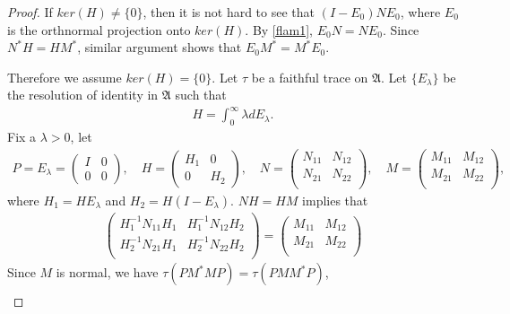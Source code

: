 \documentclass[a4paper,10pt]{amsart}
\newcommand{\AAA}{\mathfrak A}
\begin{document}
\begin{proof}
    If $ker(H) \neq \{0\}$, then it is not hard to see that 
    $(I-E_{0})NE_{0}$, where $E_0$ is the orthnormal projection 
    onto $ker(H)$. 
    By \cref{flam1}, $E_{0}N = NE_{0}$. 
    Since $N^{*}H = HM^{*}$, similar argument shows
    that $E_{0}M^{*} = M^{*}E_{0}$.
    
    Therefore we assume $ker(H) = \{0\}$.
    Let $\tau$ be a faithful trace on $\AAA$.
    Let $\{ E_{\lambda} \}$ be the resolution of identity in $\AAA$ such that
    \begin{align*}
        H = \int_{0}^{\infty} \lambda d E_{\lambda}. 
    \end{align*}
Fix a $\lambda > 0$, let
\begin{align*}
    P = E_{\lambda} = \begin{pmatrix}
          I & 0\\
          0 & 0
      \end{pmatrix}, \quad 
   H = \begin{pmatrix}
       H_1 & 0\\
       0 & H_2
   \end{pmatrix}, \quad  
   N = \begin{pmatrix}
       N_{11} & N_{12}\\ 
       N_{21} & N_{22} \\
   \end{pmatrix}, \quad  
   M = \begin{pmatrix}
       M_{11} & M_{12}\\ 
       M_{21} & M_{22} \\
   \end{pmatrix},
\end{align*}
where $H_1 = HE_{\lambda}$ and $H_2 = H(I-E_{\lambda})$.
$NH = HM$ implies that
\begin{align*}
   \begin{pmatrix}
       H_{1}^{-1}N_{11}H_{1} & H_{1}^{-1}N_{12}H_{2}\\
       H_{2}^{-1}N_{21}H_{1} & H_{2}^{-1}N_{22}H_{2}\\
   \end{pmatrix} = 
   \begin{pmatrix}
       M_{11} & M_{12}\\ 
       M_{21} & M_{22} \\
   \end{pmatrix}
\end{align*}
Since $M$ is normal, we have $\tau(PM^{*}MP) = \tau(PMM^{*}P)$, 
\begin{align*}

\end{align*}
\end{proof}
\end{document}
